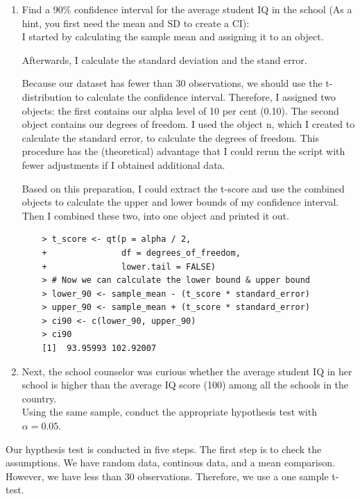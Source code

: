 \documentclass[12pt,letterpaper]{article}
\begin{document}
\begin{enumerate}
	\item Find a 90\% confidence interval for the average student IQ in the school (As a hint, you first need the mean and SD to create a CI):\\
	
	I started by calculating the sample mean and assigning it to an object. 

	Afterwards, I calculate the standard deviation and the stand error.


Because our dataset has fewer than 30 observations, we should use the t-distribution to calculate the confidence interval. Therefore, I assigned two objects: the first contains our alpha level of 10 per cent (0.10). The second object contains our degrees of freedom. I used the object n, which I created to calculate the standard error, to calculate the degrees of freedom. This procedure has the (theoretical) advantage that I could rerun the script with fewer adjustments if I obtained additional data.



Based on this preparation, I could extract the t-score and use the combined objects to calculate the upper and lower bounds of my confidence interval. Then I combined these two, into one object and printed it out. 

\begin{verbatim}
	> t_score <- qt(p = alpha / 2,
	+               df = degrees_of_freedom, 
	+               lower.tail = FALSE)
	> # Now we can calculate the lower bound & upper bound
	> lower_90 <- sample_mean - (t_score * standard_error)
	> upper_90 <- sample_mean + (t_score * standard_error) 
	> ci90 <- c(lower_90, upper_90)
	> ci90
	[1]  93.95993 102.92007
\end{verbatim}
 
	
	\item Next, the school counselor was curious  whether  the average student IQ in her school is higher than the average IQ score (100) among all the schools in the country.\\ 
	

	\noindent Using the same sample, conduct the appropriate hypothesis test with $\alpha=0.05$.
\end{enumerate}

Our hypthesis test is conducted in five steps.
The first step is to check the assumptions.
We have random data, continous data, and a mean comparison.
However, we have less than 30 observations. Therefore, we use a one sample t-test.
\end{document}
